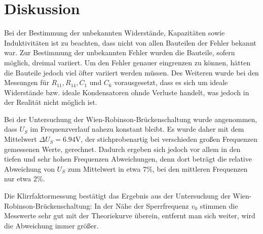 \section{Diskussion}
\label{sec:Diskussion}
Bei der Bestimmung der unbekannten Widerstände, Kapazitäten sowie Induktivitäten
ist zu beachten, dass nicht von allen Bauteilen der Fehler bekannt war. Zur Bestimmung
der unbekannten Fehler wurden die Bauteile, sofern möglich, dreimal variiert.
Um den Fehler genauer eingrenzen zu können, hätten die Bauteile jedoch viel öfter
variiert werden müssen.
Des Weiteren wurde bei den Messungen für $R_{11}, R_{14}, C_1 \text{ und } C_6$
vorausgesetzt, dass es sich um ideale Widerstände bzw. ideale Kondensatoren ohnde
Verluste handelt, was jedoch in der Realität nicht möglich ist.

Bei der Untersuchung der Wien-Robinson-Brückenschaltung wurde angenommen, dass $U_S$
im Frequenzverlauf nahezu konstant bleibt. Es wurde daher mit dem Mittelwert
$\Delta{U_S}=6.94 \si{\volt}$, der stichprobenartig bei verschieden großen Frequenzen
gemessenen Werte, gerechnet. Dadurch ergeben sich jedoch vor allem in den tiefen
und sehr hohen Frequenzen Abweichungen, denn dort beträgt die relative Abweichung
von $U_S$ zum Mittelwert in etwa 7\%, bei den mittleren Frequenzen nur etwa 2\%.

Die Klirrfaktormessung bestätigt das Ergebnis aus der Untersuchung der
Wien-Robinson-Brückenschaltung: In der Nähe der Sperrfrequenz $v_0$ stimmen die
Messwerte sehr gut mit der Theoriekurve überein, entfernt man sich weiter, wird
die Abweichung immer größer.
